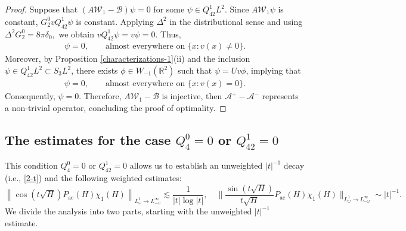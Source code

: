 \documentclass[reqno]{amsart}
\numberwithin{equation}{section}
\begin{document}
\begin{proof}
	Suppose that $(A\mathcal{W}_1 - \mathcal{B})\psi=0$ for some
	$\psi\in Q_{42}^1L^2$. Since
	$
	A \mathcal{W}_1 \psi
	$
	is constant,
	$
	G_2^0 v Q_{42}^1\psi
	$
	is constant. Applying $\Delta^2$ in the distributional sense and
	using
	$
	\Delta^2G_2^0
	=
	8\pi\delta_0,
	$
	we obtain
	$
	vQ_{42}^1\psi=v\psi=0.
	$ Thus, \begin{align}\label{psi1}
\psi=0,
\qquad\text{almost everywhere on }\{x:v(x)\neq0\}.
\end{align} Moreover,
	 by Proposition \ref{characterizations-1}(ii) and the inclusion $\psi \in Q_{42}^1 L^2 \subset S_3 L^2$, there exists $\phi \in W_{-1}(\mathbb{R}^2)$ such that $\psi = U v \phi$, implying that \begin{align}\label{psi2}
\psi=0,
\qquad\text{almost everywhere on }\{x:v(x)=0\}.
\end{align}
 Consequently, $\psi = 0$.
Therefore, $A\mathcal{W}_1 - \mathcal{B}$ is injective, then $\mathcal{A}^+ - \mathcal{A}^-$ represents a non-trivial operator, concluding the proof of optimality.  
\end{proof}  

\subsection{The estimates for the case $Q_{4}^0 = 0$ or $Q_{42}^1 = 0$}\label{subsec:second_2}
This condition $Q_{4}^0 = 0$ or $Q_{42}^1 = 0$ allows us to establish an unweighted $| t |^{-1}$ decay (i.e., \eqref{2-t}) and the following weighted estimates:  
\[ 
	\left \|\cos (t \sqrt{H}) P_{\mathrm{ac}}(H)\chi_1(H)\right\|_{L^1_\omega\to L^\infty_{-\omega}} \lesssim\frac{1}{|t|\log |t|},  \quad \bigg\|\frac{\sin (t \sqrt{H})}{t\sqrt{H}} P_{\mathrm{ac}}(H)\chi_1(H)\bigg\|_{L^1_\omega\to L^\infty_{-\omega}}\sim|t|^{-1}.  
\]  
We divide the analysis into two parts, starting with the unweighted $| t |^{-1}$ estimate.  
\end{document}

